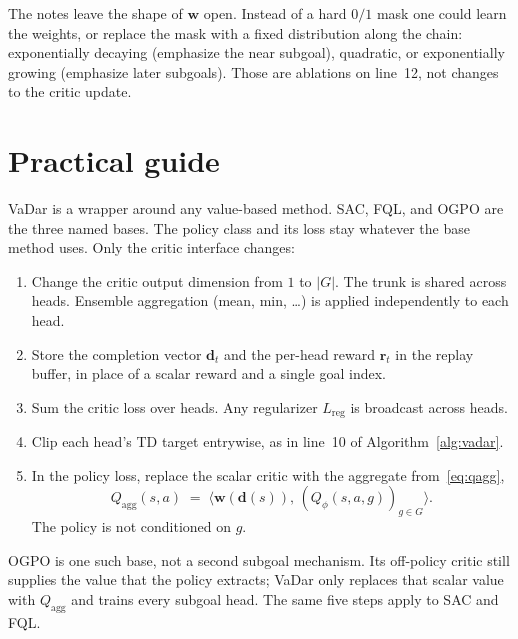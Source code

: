 \documentclass[11pt]{article}
\begin{document}
The notes leave the shape of $\mathbf{w}$ open.
Instead of a hard $0/1$ mask one could learn the weights, or replace the mask with a fixed distribution along the chain: exponentially decaying (emphasize the near subgoal), quadratic, or exponentially growing (emphasize later subgoals).
Those are ablations on line~12, not changes to the critic update.

\section{Practical guide}
VaDar is a wrapper around any value-based method. SAC, FQL, and OGPO are the three named bases.
The policy class and its loss stay whatever the base method uses.
Only the critic interface changes:
\begin{enumerate}[leftmargin=1.4em,itemsep=0.45em]
  \item Change the critic output dimension from $1$ to $|G|$.
        The trunk is shared across heads.
        Ensemble aggregation (mean, min, \ldots) is applied independently to each head.
  \item Store the completion vector $\mathbf{d}_t$ and the per-head reward $\mathbf{r}_t$ in the replay buffer, in place of a scalar reward and a single goal index.
  \item Sum the critic loss over heads. Any regularizer $L_{\mathrm{reg}}$ is broadcast across heads.
  \item Clip each head's TD target entrywise, as in line~10 of Algorithm~\ref{alg:vadar}.
  \item In the policy loss, replace the scalar critic with the aggregate from~\eqref{eq:qagg},
        \[
          Q_{\mathrm{agg}}(s,a)
          \;=\;
          \big\langle \mathbf{w}(\mathbf{d}(s)),\, (Q_\phi(s,a,g))_{g\in G}\big\rangle.
        \]
        The policy is not conditioned on $g$.
\end{enumerate}

OGPO is one such base, not a second subgoal mechanism.
Its off-policy critic still supplies the value that the policy extracts; VaDar only replaces that scalar value with $Q_{\mathrm{agg}}$ and trains every subgoal head.
The same five steps apply to SAC and FQL.
\end{document}
